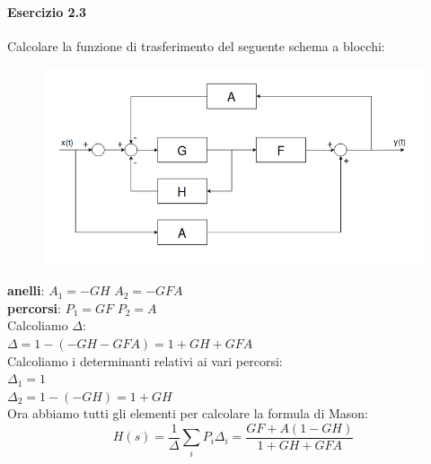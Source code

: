 \documentclass[12pt,a4paper]{article}
\begin{document}
 	\paragraph{Esercizio 2.3} Calcolare la funzione di trasferimento del seguente schema a blocchi:
 	\begin{figure}[h!]
 		\centering
 		\includegraphics[scale=0.5]{./images/schema23.png}
 	\end{figure}

 	\hspace{-18px}\textbf{anelli}: $A_1 = -GH$ \quad $A_2 = -GFA$\\
 	\textbf{percorsi}: $P_1 = GF$ \quad $P_2 = A$ \\

 	\hspace{-18px}Calcoliamo $\Delta$:\\
 	$\Delta = 1 - (-GH-GFA) = 1 + GH + GFA$\\


 	\hspace{-18px}Calcoliamo i determinanti relativi ai vari percorsi:\\
 	$\Delta_1 = 1$\\
 	$\Delta_2 = 1-(-GH) = 1 + GH$\\

 	\hspace{-18px}Ora abbiamo tutti gli elementi per calcolare la formula di Mason:
 	\[
 		H(s) = \frac{1}{\Delta}\sum_i P_i \Delta_i = \frac{GF + A(1-GH)}{1+GH+GFA}
 	\]
	\newpage
\end{document}
